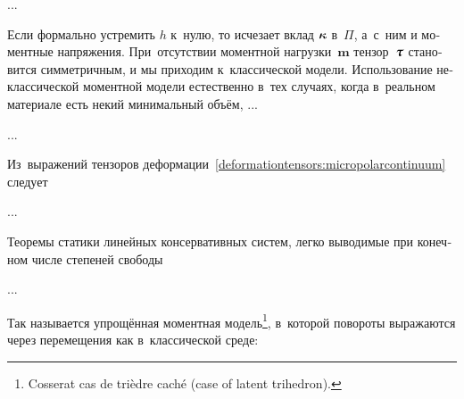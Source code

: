 \begin{otherlanguage}{russian}
...


Если формально устремить $h$ к~нулю, то исчезает вклад $\bm{\kappa}\hspace{-0.1ex}$ в~$\Pi$, а~с~ним и моментные напряжения. При~отсутствии моментной нагрузки~$\bm{m}$ тензор~$\forcestresstensor$ становится симметричным, и мы приходим к~классической модели. Использование неклассической моментной модели естественно в~тех случаях, когда в~реальном материале есть некий минимальный объём, ...

...



\label{para:compatibilityequations.cosseratcontinuum}

Из~выражений тензоров деформации~\eqref{deformationtensors:micropolarcontinuum} следует

...





Теоремы статики линейных консервативных систем, легко выводимые при конечном числе степеней свободы

...





\label{para:caseoflatenttrihedron.smalldisplacementsandrotations}

Так называется упрощённая моментная модель\footnote{Cosserat  cas de trièdre caché (case of latent trihedron).}\hspace{-0.32em},\hspace{0.24em} в~которой повороты выражаются через перемещения как в~классической среде: %


\end{otherlanguage}
